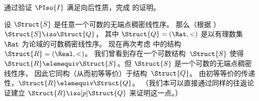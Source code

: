 \documentclass[../../../include/open-logic-section]{subfiles}
\begin{document}
\begin{prob}
  通过验证 $\PIso{I}$ 满足向后性质，完成
   的证明。
\end{prob}

\begin{rem}
  设 $\Struct{S}$ 是任意一个可数的无端点稠密线性序。
  那么（根据 ）$\Struct{S} \iso \Struct{Q}$，
  其中 $\Struct{Q} = (\Rat, <)$ 是以有理数集 $\Rat$ 为论域的可数稠密线性序。
  现在再次考虑  中的结构~$\Struct{R} = (\Real, <)$。
  我们曾看到存在一个可数结构~$\Struct{S}$ 使得 $\Struct{R} \elemequiv
  \Struct{S}$。但 $\Struct{S}$ 是一个可数的无端点稠密线性序，
  因此它同构（从而初等等价）于结构~$\Struct{Q}$。
  由初等等价的传递性，$\Struct{R} \elemequiv \Struct{Q}$。
  （我们本可以直接通过同样的往返论证建立 $\Struct{R} \iso[p] \Struct{Q}$ 来证明这一点。）
\end{rem}
\end{document}
